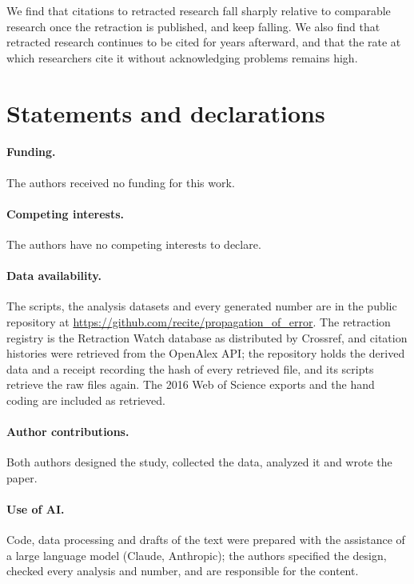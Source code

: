 \documentclass[11pt,letterpaper]{article}
\begin{document}
We find that citations to retracted research fall sharply relative to comparable research once the retraction is published, and keep falling. We also find that retracted research continues to be cited for years afterward, and that the rate at which researchers cite it without acknowledging problems remains high.

\section*{Statements and declarations}
\paragraph{Funding.} The authors received no funding for this work.
\paragraph{Competing interests.} The authors have no competing interests to declare.
\paragraph{Data availability.} The scripts, the analysis datasets and every generated number are in the public repository at \url{https://github.com/recite/propagation_of_error}. The retraction registry is the Retraction Watch database as distributed by Crossref, and citation histories were retrieved from the OpenAlex API; the repository holds the derived data and a receipt recording the hash of every retrieved file, and its scripts retrieve the raw files again. The 2016 Web of Science exports and the hand coding are included as retrieved.
\paragraph{Author contributions.} Both authors designed the study, collected the data, analyzed it and wrote the paper.
\paragraph{Use of AI.} Code, data processing and drafts of the text were prepared with the assistance of a large language model (Claude, Anthropic); the authors specified the design, checked every analysis and number, and are responsible for the content.

\clearpage



\clearpage
\appendix
{}
\renewcommand{\thefigure}{\thesection\arabic{figure}}
\renewcommand{\thetable}{\thesection\arabic{table}}
\end{document}
